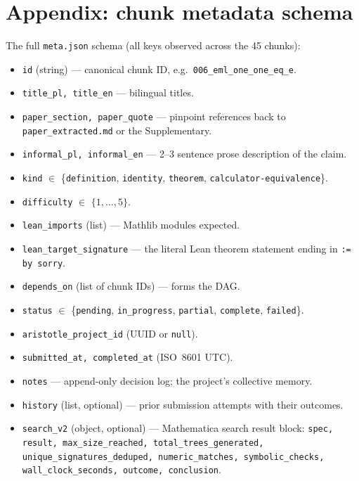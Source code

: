 \documentclass[11pt,a4paper]{article}
\theoremstyle{plain}
\theoremstyle{definition}
\begin{document}
\section{Appendix: chunk metadata schema}\label{app:meta}

The full \texttt{meta.json} schema (all keys observed across the 45
chunks):

\begin{itemize}[leftmargin=*,nosep]
\item \texttt{id} (string) --- canonical chunk ID, e.g.~\texttt{006\_eml\_one\_one\_eq\_e}.
\item \texttt{title\_pl, title\_en} --- bilingual titles.
\item \texttt{paper\_section, paper\_quote} --- pinpoint references
back to \texttt{paper\_extracted.md} or the Supplementary.
\item \texttt{informal\_pl, informal\_en} --- 2--3 sentence prose
description of the claim.
\item \texttt{kind} $\in$ \{\texttt{definition},
\texttt{identity}, \texttt{theorem},
\texttt{calculator-equivalence}\}.
\item \texttt{difficulty} $\in$ $\{1,\dots,5\}$.
\item \texttt{lean\_imports} (list) --- Mathlib modules expected.
\item \texttt{lean\_target\_signature} --- the literal Lean theorem
statement ending in \texttt{:= by sorry}.
\item \texttt{depends\_on} (list of chunk IDs) --- forms the DAG.
\item \texttt{status} $\in$ \{\texttt{pending},
\texttt{in\_progress}, \texttt{partial}, \texttt{complete},
\texttt{failed}\}.
\item \texttt{aristotle\_project\_id} (UUID or \texttt{null}).
\item \texttt{submitted\_at, completed\_at} (ISO~8601 UTC).
\item \texttt{notes} --- append-only decision log; the project's
collective memory.
\item \texttt{history} (list, optional) --- prior submission attempts
with their outcomes.
\item \texttt{search\_v2} (object, optional) --- Mathematica search
result block: \texttt{spec, result, max\_size\_reached,
total\_trees\_generated, unique\_signatures\_deduped, numeric\_matches,
symbolic\_checks, wall\_clock\_seconds, outcome, conclusion}.
\end{itemize}
\end{document}
